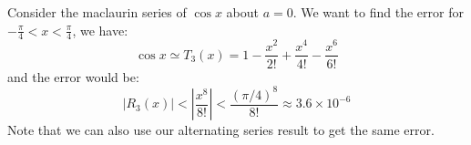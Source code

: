 \begin{itemize}
\begin{example}
\begin{equation}
        \end{equation}
    \end{example}
    \begin{example}
        Consider the maclaurin series of $\cos x$ about $a=0$. We want to find the error for $-\frac{\pi}{4}<x<\frac{\pi}{4}$, we have:
        \begin{equation}
            \cos x \simeq T_3(x) = 1-\frac{x^2}{2!} + \frac{x^4}{4!} - \frac{x^6}{6!}
        \end{equation}
        and the error would be:
        \begin{equation}
            |R_3(x)| < \left|\frac{x^8}{8!}\right| < \frac{(\pi/4)^8}{8!} \approx 3.6 \times 10^{-6}
        \end{equation}
        Note that we can also use our alternating series result to get the same error.
    \end{example}
\end{itemize}